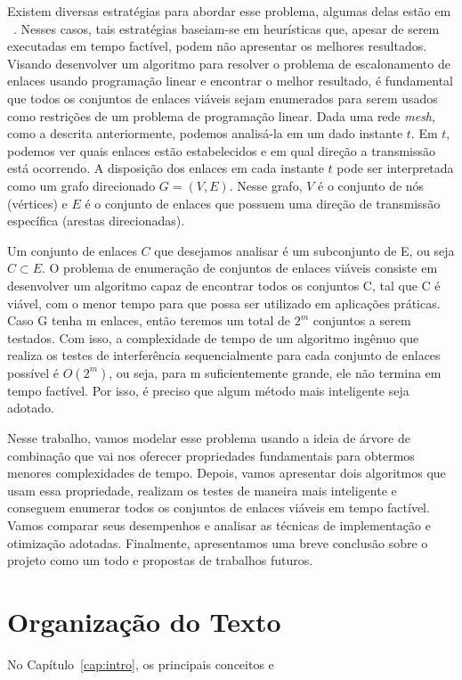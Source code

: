 Existem diversas estratégias para abordar esse problema, algumas delas estão em ~\cite{ciscoforecast, elevationdata}. Nesses casos, tais estratégias baseiam-se em heurísticas que, apesar de serem executadas em tempo factível, podem não apresentar os melhores resultados. Visando desenvolver um algoritmo para resolver o problema de escalonamento de enlaces usando programação linear e encontrar o melhor resultado, é fundamental que todos os conjuntos de enlaces viáveis sejam enumerados para serem usados como restrições de um problema de programação linear.
Dada uma rede {\it mesh}, como a descrita anteriormente, podemos analisá-la em um dado instante $t$. Em $t$, podemos ver quais enlaces estão estabelecidos e em qual direção a transmissão está ocorrendo. A disposição dos enlaces em cada instante $t$ pode ser interpretada como um grafo direcionado $G=(V, E)$. Nesse grafo, $V$ é o conjunto de nós (vértices) e $E$ é o conjunto de enlaces que possuem uma direção de transmissão específica (arestas direcionadas). 

Um conjunto de enlaces $C$ que desejamos analisar é um subconjunto de E, ou seja $C \subset E$.
O problema de enumeração de conjuntos de enlaces viáveis consiste em desenvolver um algoritmo capaz de encontrar todos os conjuntos C, tal que C é viável, com o menor tempo para que possa ser  utilizado em aplicações práticas.
Caso G tenha m enlaces, então teremos um total de $2^m$ conjuntos a serem testados. Com isso, a complexidade de tempo de um algoritmo ingênuo que realiza os testes de interferência sequencialmente para cada conjunto de enlaces possível é $O(2^m)$, ou seja, para m suficientemente grande, ele não termina em tempo factível. Por isso, é preciso que algum método mais inteligente seja adotado.

Nesse trabalho, vamos modelar esse problema usando a ideia de árvore de combinação que vai nos oferecer propriedades fundamentais para obtermos menores  complexidades de tempo. Depois, vamos apresentar dois algoritmos que usam essa propriedade, realizam os testes de maneira mais inteligente e conseguem enumerar todos os conjuntos de enlaces viáveis em tempo factível. Vamos comparar seus desempenhos e analisar as técnicas de implementação e otimização adotadas. Finalmente, apresentamos uma breve conclusão sobre o projeto como um todo e propostas de trabalhos futuros.


\section{Organização do Texto}

No Capítulo~\ref{cap:intro}, os principais conceitos e

